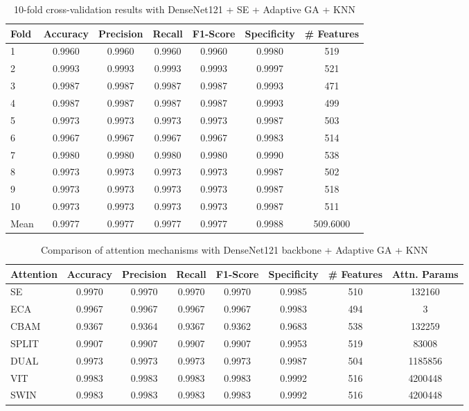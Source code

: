 \documentclass{article}
\begin{document}
\begin{table}[htbp]
\centering
\caption{10-fold cross-validation results with DenseNet121 + SE + Adaptive GA + KNN}
\label{tab:table4}
\begin{tabular}{lcccccc}
\toprule
Fold & Accuracy & Precision & Recall & F1-Score & Specificity & \# Features \\
\midrule
1 & 0.9960 & 0.9960 & 0.9960 & 0.9960 & 0.9980 & 519 \\
2 & 0.9993 & 0.9993 & 0.9993 & 0.9993 & 0.9997 & 521 \\
3 & 0.9987 & 0.9987 & 0.9987 & 0.9987 & 0.9993 & 471 \\
4 & 0.9987 & 0.9987 & 0.9987 & 0.9987 & 0.9993 & 499 \\
5 & 0.9973 & 0.9973 & 0.9973 & 0.9973 & 0.9987 & 503 \\
6 & 0.9967 & 0.9967 & 0.9967 & 0.9967 & 0.9983 & 514 \\
7 & 0.9980 & 0.9980 & 0.9980 & 0.9980 & 0.9990 & 538 \\
8 & 0.9973 & 0.9973 & 0.9973 & 0.9973 & 0.9987 & 502 \\
9 & 0.9973 & 0.9973 & 0.9973 & 0.9973 & 0.9987 & 518 \\
10 & 0.9973 & 0.9973 & 0.9973 & 0.9973 & 0.9987 & 511 \\
Mean & 0.9977 & 0.9977 & 0.9977 & 0.9977 & 0.9988 & 509.6000 \\
\bottomrule
\end{tabular}
\end{table}

\begin{table}[htbp]
\centering
\caption{Comparison of attention mechanisms with DenseNet121 backbone + Adaptive GA + KNN}
\label{tab:table5}
\begin{tabular}{lccccccc}
\toprule
Attention & Accuracy & Precision & Recall & F1-Score & Specificity & \# Features & Attn. Params \\
\midrule
SE & 0.9970 & 0.9970 & 0.9970 & 0.9970 & 0.9985 & 510 & 132160 \\
ECA & 0.9967 & 0.9967 & 0.9967 & 0.9967 & 0.9983 & 494 & 3 \\
CBAM & 0.9367 & 0.9364 & 0.9367 & 0.9362 & 0.9683 & 538 & 132259 \\
SPLIT & 0.9907 & 0.9907 & 0.9907 & 0.9907 & 0.9953 & 519 & 83008 \\
DUAL & 0.9973 & 0.9973 & 0.9973 & 0.9973 & 0.9987 & 504 & 1185856 \\
VIT & 0.9983 & 0.9983 & 0.9983 & 0.9983 & 0.9992 & 516 & 4200448 \\
SWIN & 0.9983 & 0.9983 & 0.9983 & 0.9983 & 0.9992 & 516 & 4200448 \\
\bottomrule
\end{tabular}
\end{table}
\end{document}

